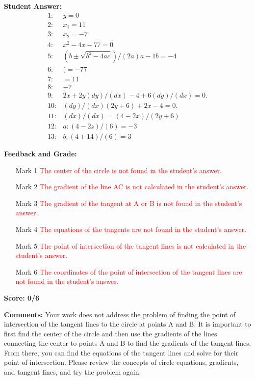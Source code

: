 \documentclass{article}
\begin{document}
\textbf{Student Answer:}
\begin{align*}
1: & y=0 \\
2: & x_1=11 \\
3: & x_2=-7 \\
4: & x^{2}-4x-77=0 \\
5: & (b\pm\sqrt{b^{2}-4ac})/(2a)a-1b=-4 \\
6: & (=-77 \\
7: & =11 \\
8: & -7 \\
9: & 2x+2y(dy)/(dx)-4+6(dy)/(dx)=0. \\
10: & (dy)/(dx)(2y+6)+2x-4=0. \\
11: & (dx)/(dx)=(4-2x)/(2y+6) \\
12: & a:(4-2z)/(6)=-3 \\
13: & b:(4+14)/(6)=3
\end{align*}

\textbf{Feedback and Grade:}
\begin{itemize}
\item[Mark 1] \textcolor{red}{The center of the circle is not found in the student's answer.}
\item[Mark 2] \textcolor{red}{The gradient of the line AC is not calculated in the student's answer.}
\item[Mark 3] \textcolor{red}{The gradient of the tangent at A or B is not found in the student's answer.}
\item[Mark 4] \textcolor{red}{The equations of the tangents are not found in the student's answer.}
\item[Mark 5] \textcolor{red}{The point of intersection of the tangent lines is not calculated in the student's answer.}
\item[Mark 6] \textcolor{red}{The coordinates of the point of intersection of the tangent lines are not found in the student's answer.}
\end{itemize}

\textbf{Score: 0/6}

\textbf{Comments:} Your work does not address the problem of finding the point of intersection of the tangent lines to the circle at points A and B. It is important to first find the center of the circle and then use the gradients of the lines connecting the center to points A and B to find the gradients of the tangent lines. From there, you can find the equations of the tangent lines and solve for their point of intersection. Please review the concepts of circle equations, gradients, and tangent lines, and try the problem again.
\end{document}
